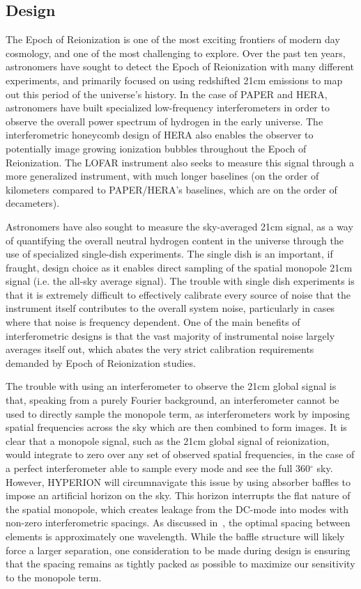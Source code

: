 \documentclass[11pt]{report}
\begin{document}
\subsection{Design}

The Epoch of Reionization is one of the most exciting frontiers of modern day 
cosmology, and one of the most challenging to explore. Over the past ten years, 
astronomers have sought to detect the Epoch of Reionization with many different 
experiments, and primarily focused on using redshifted 21cm emissions to map 
out this period of the universe's history.  In the case of PAPER and HERA, 
astronomers have built specialized low-frequency interferometers in order to 
observe the overall power spectrum of hydrogen in the early universe.  The 
interferometric honeycomb design of HERA also enables the observer to 
potentially image growing ionization bubbles throughout the Epoch of 
Reionization. The LOFAR instrument also seeks to measure this signal through a 
more generalized instrument, with much longer baselines (on the order of 
kilometers compared to PAPER/HERA's baselines, which are on the order of 
decameters). 

Astronomers have also sought to measure the sky-averaged 21cm signal, as a way 
of quantifying the overall neutral hydrogen content in the universe through the 
use of specialized single-dish experiments. The single dish is an important, if 
fraught, design choice as it enables direct sampling of the spatial monopole 
21cm signal (i.e. the all-sky average signal). The trouble with single dish 
experiments is that it is extremely difficult to effectively calibrate every 
source of noise that the instrument itself contributes to the overall system 
noise, particularly in cases where that noise is frequency dependent. One of 
the main benefits of interferometric designs is that the vast majority of 
instrumental noise largely averages itself out, which abates the very strict 
calibration requirements demanded by Epoch of Reionization studies.

The trouble with using an interferometer to observe the 21cm global signal is 
that, speaking from a purely Fourier background, an interferometer cannot be 
used to directly sample the monopole term, as interferometers work by imposing 
spatial frequencies across the sky which are then combined to form images. It 
is clear that a monopole signal, such as the 21cm global signal of 
reionization, would integrate to zero over any set of observed spatial 
frequencies, in the case of a perfect interferometer able to sample every mode 
and see the full 360$^\circ$ sky.  However, HYPERION will circumnavigate this 
issue by using absorber baffles to impose an artificial horizon on the sky.  
This horizon interrupts the flat nature of the spatial monopole, which creates 
leakage from the DC-mode into modes with non-zero interferometric spacings.  As 
discussed in~\cite{presley2015}, the optimal spacing between elements is 
approximately one wavelength. While the baffle structure will likely force a 
larger separation, one consideration to be made during design is ensuring that 
the spacing remains as tightly packed as possible to maximize our sensitivity 
to the monopole term.
\end{document}
